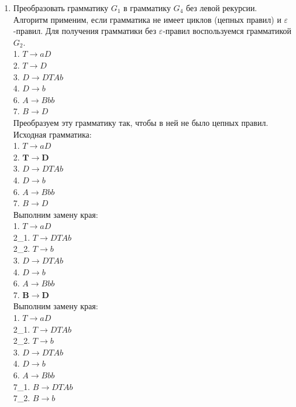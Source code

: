 \documentclass[a4paper,14pt]{extarticle}
\begin{document}
\begin{enumerate}[1.]

\item Преобразовать грамматику $G_1$ в грамматику $G_4$ без левой рекурсии.\\

Алгоритм применим, если грамматика не имеет циклов (цепных правил) и $\varepsilon$-правил.
Для получения грамматики без $\varepsilon$-правил воспользуемся грамматикой $G_2$.\\
1. $T \rightarrow aD$\\
2. $T \rightarrow D$\\
3. $D \rightarrow DTAb$\\
4. $D \rightarrow b$\\
6. $A \rightarrow Bbb$\\
7. $B \rightarrow D$\\
Преобразуем эту грамматику так, чтобы в ней не было цепных правил.\\

Исходная грамматика:\\
1. $T \rightarrow aD$\\
2. $\mathbf{T \rightarrow D}$\\
3. $D \rightarrow DTAb$\\
4. $D \rightarrow b$\\
6. $A \rightarrow Bbb$\\
7. $B \rightarrow D$\\

Выполним замену края:\\
1. $T \rightarrow aD$\\
2\_1. $T \rightarrow DTAb$\\
2\_2. $T \rightarrow b$\\
3. $D \rightarrow DTAb$\\
4. $D \rightarrow b$\\
6. $A \rightarrow Bbb$\\
7. $\mathbf{B \rightarrow D}$\\

Выполним замену края:\\
1. $T \rightarrow aD$\\
2\_1. $T \rightarrow DTAb$\\
2\_2. $T \rightarrow b$\\
3. $D \rightarrow DTAb$\\
4. $D \rightarrow b$\\
6. $A \rightarrow Bbb$\\
7\_1. $B \rightarrow DTAb$\\
7\_2. $B \rightarrow b$\\


\end{enumerate}
\end{document}
